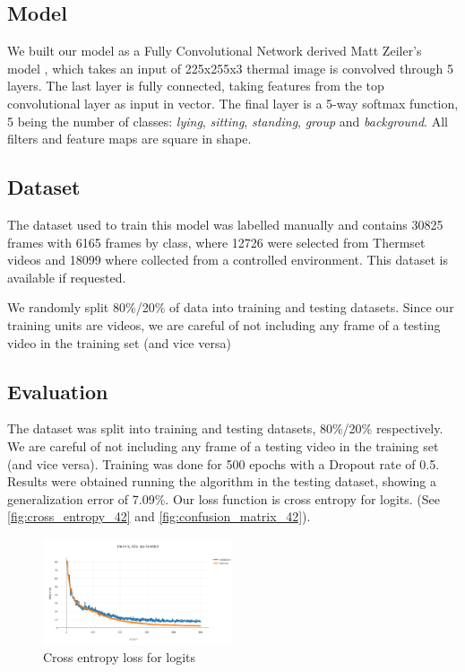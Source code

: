 \documentclass[oneside, twocolumn]{article}
\begin{document}
\subsection{Model}

We built our model as a Fully Convolutional Network derived Matt Zeiler's model \cite{zeiler-2014}, which takes an input of 225x255x3 thermal image is convolved through 5 layers. The last layer is fully connected, taking features from the top convolutional layer as input in vector. The final layer is a 5-way softmax function, 5 being the number of classes: \textit{lying}, \textit{sitting}, \textit{standing}, \textit{group} and \textit{background}. All filters and feature maps are square in shape.

\subsection{Dataset}
The dataset used to train this model was labelled manually and contains 30825 frames with 6165 frames by class, where 12726 were selected from Thermset videos and 18099 where collected from a controlled environment. This dataset is available if requested.

We randomly split 80\%/20\% of data into training and testing datasets. Since our training units are videos, we are careful of not including any frame of a testing video in the training set (and vice versa)

\subsection{Evaluation}
The dataset was split   into training and testing datasets,  80\%/20\%   respectively. We are careful of not including any frame of a testing video in the training set (and vice versa). Training was done for 500 epochs with a Dropout rate of 0.5. Results were obtained running the algorithm in the testing dataset, showing a  generalization  error of  7.09\%. Our loss function is cross entropy for logits. (See \autoref{fig:cross_entropy_42} and \autoref{fig:confusion_matrix_42}).

\begin{figure}
  \centering
    \includegraphics[width=0.5\textwidth]{images/loss_42.png}
  \caption{Cross entropy loss for logits}
  \label{fig:cross_entropy_42}
\end{figure}
\end{document}
